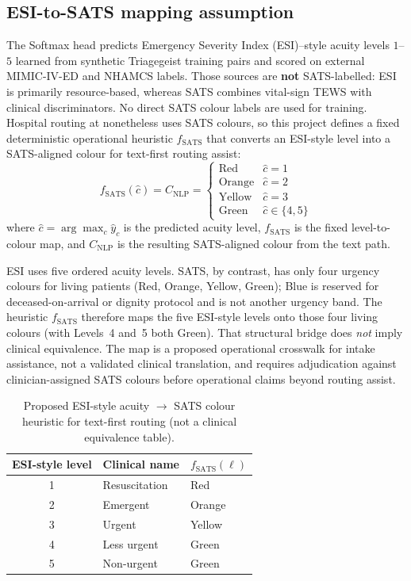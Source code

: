 \subsection{ESI-to-SATS mapping assumption}

The Softmax head predicts Emergency Severity Index (ESI)--style acuity levels \(1\)--\(5\) learned from synthetic Triagegeist training pairs and scored on external MIMIC-IV-ED and NHAMCS labels. Those sources are \textbf{not} SATS-labelled: ESI is primarily resource-based, whereas SATS combines vital-sign TEWS with clinical discriminators. No direct SATS colour labels are used for training. Hospital routing at \examplehospital{} nonetheless uses SATS colours, so this project defines a fixed deterministic operational heuristic \(f_{\mathrm{SATS}}\) that converts an ESI-style level into a SATS-aligned colour for text-first routing assist:
\begin{equation}
  f_{\mathrm{SATS}}(\hat{c}) = C_{\mathrm{NLP}} = \begin{cases}
    \text{Red} & \hat{c} = 1 \\
    \text{Orange} & \hat{c} = 2 \\
    \text{Yellow} & \hat{c} = 3 \\
    \text{Green} & \hat{c} \in \{4, 5\}
  \end{cases}
\end{equation}
where \(\hat{c} = \arg\max_c \hat{y}_c\) is the predicted acuity level, \(f_{\mathrm{SATS}}\) is the fixed level-to-colour map, and \(C_{\mathrm{NLP}}\) is the resulting SATS-aligned colour from the text path.

ESI uses five ordered acuity levels. SATS, by contrast, has only four urgency colours for living patients (Red, Orange, Yellow, Green); Blue is reserved for deceased-on-arrival or dignity protocol and is not another urgency band. The heuristic \(f_{\mathrm{SATS}}\) therefore maps the five ESI-style levels onto those four living colours (with Levels~4 and~5 both Green). That structural bridge does \emph{not} imply clinical equivalence. The map is a proposed operational crosswalk for intake assistance, not a validated clinical translation, and requires adjudication against clinician-assigned SATS colours before operational claims beyond routing assist.

\begin{table}[H]
\centering
\small
\begin{tabular}{|c|l|l|}
\hline
\textbf{ESI-style level} & \textbf{Clinical name} & \(f_{\mathrm{SATS}}(\ell)\) \\
\hline
1 & Resuscitation & Red \\
2 & Emergent & Orange \\
3 & Urgent & Yellow \\
4 & Less urgent & Green \\
5 & Non-urgent & Green \\
\hline
\end{tabular}
\caption{Proposed ESI-style acuity \(\rightarrow\) SATS colour heuristic for text-first routing (not a clinical equivalence table).}
\label{tab:fsats-esi}
\end{table}

